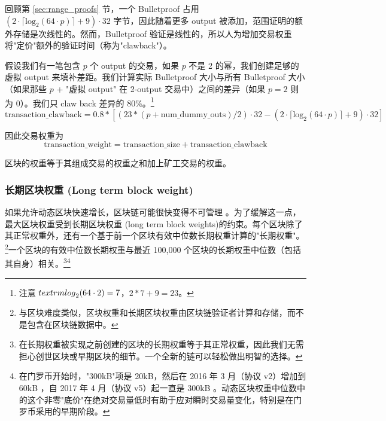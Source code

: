 回顾第 \ref{sec:range_proofs} 节，一个 Bulletproof 占用 $(2 \cdot \lceil \textrm{log}_2(64 \cdot p) \rceil + 9) \cdot 32$ 字节，因此随着更多 output 被添加，范围证明的额外存储是次线性的。然而，Bulletproof 验证是线性的，所以人为增加交易权重将"定价"额外的验证时间（称为"clawback"）。%

假设我们有一笔包含 $p$ 个 output 的交易，如果 $p$ 不是 2 的幂，我们创建足够的虚拟 output 来填补差距。我们计算实际 Bulletproof 大小与所有 Bulletproof 大小（如果那些 $p$ + "虚拟 output" 在 2-output 交易中）之间的差异（如果 $p = 2$ 则为 0）。我们只 claw back 差异的 80\%。\footnote{注意 $\\textrm{log}_2(64 \cdot 2) = 7$，$2*7 + 9 = 23$。}\vspace{.175cm}
\[\textrm{transaction\_clawback} = 0.8*[(23*(p + \textrm{num\_dummy\_outs})/2) \cdot 32 - (2 \cdot \lceil \textrm{log}_2(64 \cdot p) \rceil + 9) \cdot 32]\]

因此交易权重为\vspace{.175cm}
\[\textrm{transaction\_weight} = \textrm{transaction\_size} + \textrm{transaction\_clawback}\]

区块的权重等于其组成交易的权重之和加上矿工交易的权重。


\subsubsection*{长期区块权重 (Long term block weight)}

如果允许动态区块快速增长，区块链可能很快变得不可管理 \cite{big-bang-github}。为了缓解这一点，最大区块权重受到{长期区块权重 (long term block weights)}的约束。每个区块除了其正常权重外，还有一个基于前一个区块有效中位数长期权重计算的"长期权重"。\footnote{与区块难度类似，区块权重和长期区块权重由区块链验证者计算和存储，而不是包含在区块链数据中。}一个区块的有效中位数长期权重与最近 100,000 个区块的长期权重中位数（包括其自身）相关。\footnote{在长期权重被实现之前创建的区块的长期权重等于其正常权重，因此我们无需担心创世区块或早期区块的细节。一个全新的链可以轻松做出明智的选择。}\footnote{在门罗币开始时，"300kB"项是 20kB，然后在 2016 年 3 月（协议 v2）增加到 60kB \cite{monero-0.9.3}，自 2017 年 4 月（协议 v5）起一直是 300kB \cite{monero-v5}。动态区块权重中位数中的这个非零"底价"在绝对交易量低时有助于应对瞬时交易量变化，特别是在门罗币采用的早期阶段。}%

